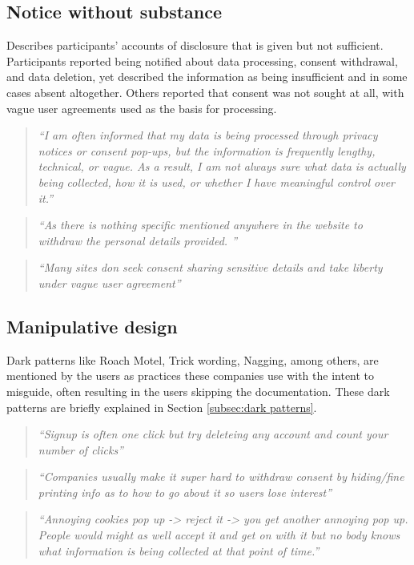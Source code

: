 \subsection{Notice without substance} \label{T3.1:Mixed info}
Describes participants' accounts of disclosure that is given but not sufficient. Participants reported being notified about data processing, consent withdrawal, and data deletion, yet described the information as being insufficient and in some cases absent altogether. Others reported that consent was not sought at all, with vague user agreements used as the basis for processing. 
        \begin{quote}
            \textit{``I am often informed that my data is being processed through privacy notices or consent pop-ups, but the information is frequently lengthy, technical, or vague. As a result, I am not always sure what data is actually being collected, how it is used, or whether I have meaningful control over it.''}
        \end{quote}
        \begin{quote}
            \textit{``As there is nothing specific mentioned anywhere in the website to withdraw the personal details provided. ''}
        \end{quote}
        \begin{quote}
            \textit{``Many sites don seek consent sharing sensitive details and take liberty under vague user agreement''}
        \end{quote}
        
\subsection{Manipulative design} \label{T3.2:Design messup}
Dark patterns like Roach Motel, Trick wording, Nagging, among others, are mentioned by the users as practices these companies use with the intent to misguide, often resulting in the users skipping the documentation. These dark patterns are briefly explained in Section \ref{subsec:dark patterns}.
        \begin{quote}
            \textit{``Signup is often one click but try deleteing any account and count your number of clicks''}
        \end{quote}
        \begin{quote}
           \textit{``Companies usually make it super hard to withdraw consent by hiding/fine printing info as to how to go about it so users lose interest''}
        \end{quote}
        \begin{quote}
            \textit{``Annoying cookies pop up -> reject it -> you get another annoying pop up. People would might as well accept it and get on with it but no body knows what information is being collected at that point of time.''}
        \end{quote}

